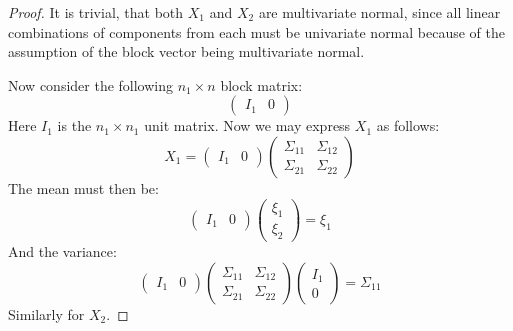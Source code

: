 \documentclass[12pt, a4paper]{article}
\numberwithin{equation}{section}
\begin{document}
\begin{proof}
It is trivial, that both $X_1$ and $X_2$ are multivariate normal, since all linear combinations of components from each must be univariate normal because of the assumption of the block vector being multivariate normal.

Now consider the following $n_1\times n$ block matrix:
\begin{equation}
\begin{pmatrix}
I_1 & 0
\end{pmatrix}
\end{equation}
Here $I_1$ is the $n_1\times n_1$ unit matrix. Now we may express $X_1$ as follows:
\begin{equation}
X_1=\begin{pmatrix}
I_1 & 0
\end{pmatrix}
\begin{pmatrix}
\Sigma_{11} & \Sigma_{12} \\
\Sigma_{21} & \Sigma_{22}
\end{pmatrix}
\end{equation} 
The mean must then be:
\begin{equation}
\begin{pmatrix}
I_1 & 0
\end{pmatrix}
\begin{pmatrix}
\xi_1 \\ \xi_2
\end{pmatrix}
=\xi_1
\end{equation}
And the variance:
\begin{equation}
\begin{pmatrix}
I_1 & 0
\end{pmatrix}
\begin{pmatrix}
\Sigma_{11} & \Sigma_{12} \\
\Sigma_{21} & \Sigma_{22}
\end{pmatrix}
\begin{pmatrix}
I_1 \\ 0
\end{pmatrix}
=\Sigma_{11}
\end{equation}
Similarly for $X_2$.
\end{proof}
\end{document}
